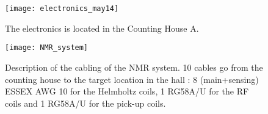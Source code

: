 \begin{figure}
\begin{center}
\centerline{\texttt{[image: electronics\_may14]}}
\caption{The electronics is located in
the Counting House A.}
\end{center}
\label{fig2:electronics_new}
\end{figure}

\begin{figure}
\begin{center}
\centerline{\texttt{[image: NMR\_system]}}
\caption{Description of the cabling of the NMR system.
10 cables go from the counting house to the target location
in the hall : 8 (main+sensing) ESSEX AWG 10 for
the Helmholtz coils, 1 RG58A/U for the RF coils and 1 RG58A/U for the
pick-up coils.}
\end{center}
\label{fig3:cabling}
\end{figure}

